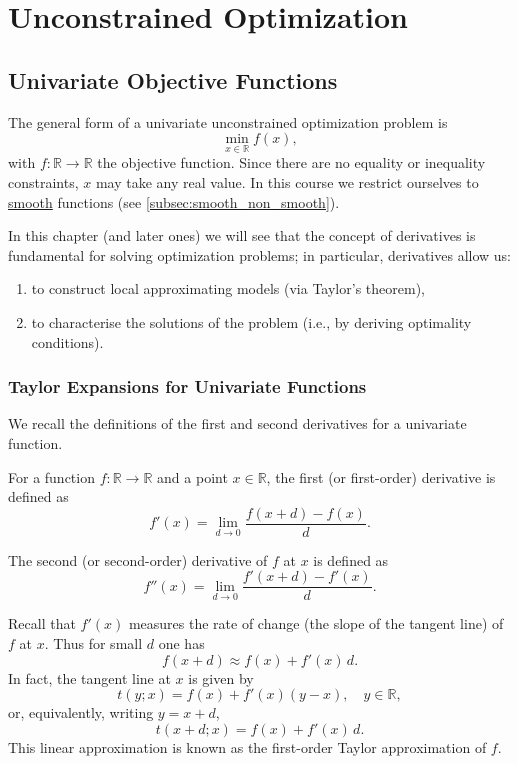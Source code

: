 \documentclass[9pt, headings=standardclasses, parskip=half]{scrartcl}
\renewcommand{\emph}[1]{\textcolor{mypurple}{#1}}
\begin{document}

\section{Unconstrained Optimization}\label{sec:unconstrained_optimization}

\subsection{Univariate Objective Functions}
The general form of a univariate unconstrained optimization problem is
\[
\min_{x\in\mathbb{R}} f(x),
\]
with \(f:\mathbb{R}\to\mathbb{R}\) the objective function. Since there are no equality or inequality constraints, \(x\) may take any real value. 
In this course we restrict ourselves to \hyperref[subsec:smooth_non_smooth]{smooth} functions (see \ref{subsec:smooth_non_smooth}).

In this chapter (and later ones) we will see that the concept of derivatives is fundamental for solving optimization problems; in particular, derivatives allow us:
\begin{enumerate}
  \item to construct local approximating models (via Taylor's theorem),
  \item to characterise the solutions of the problem (i.e., by deriving optimality conditions).
\end{enumerate}

\subsubsection{Taylor Expansions for Univariate Functions}
We recall the definitions of the first and second derivatives for a univariate function.

\begin{definition}
For a function \(f:\mathbb{R}\to\mathbb{R}\) and a point \(x\in\mathbb{R}\), the first (or first-order) derivative is defined as
\[
f'(x)=\lim_{d\to 0}\frac{f(x+d)-f(x)}{d}.
\]
\end{definition}

\begin{definition}
The second (or second-order) derivative of \(f\) at \(x\) is defined as
\[
f''(x)=\lim_{d\to 0}\frac{f'(x+d)-f'(x)}{d}.
\]
\end{definition}

Recall that \(f'(x)\) measures the rate of change (the slope of the tangent line) of \(f\) at \(x\). Thus for small \(d\) one has
\[
f(x+d)\approx f(x)+f'(x)\,d.
\]
In fact, the tangent line at \(x\) is given by
\[
t(y;x)=f(x)+f'(x)(y-x),\quad y\in\mathbb{R},
\]
or, equivalently, writing \(y=x+d\),
\[
t(x+d;x)=f(x)+f'(x)\,d.
\]
This linear approximation is known as the \emph{first-order Taylor approximation} of \(f\).
\end{document}
